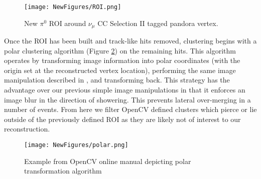 \documentclass[12pt]{article}
\begin{document}
\begin{figure}[h!]
\centering
\texttt{[image: NewFigures/ROI.png]}
\caption{New $\pi^0$ ROI around $\nu_\mu$ CC Selection II tagged pandora vertex. }
\label{fig:roi}
\end{figure}

\par Once the ROI has been built and track-like hits removed, clustering begins with a polar clustering algorithm (Figure \ref{fig:polar}) on the remaining hits. This algorithm operates by transforming image information into polar coordinates (with the origin set at the reconstructed vertex location), performing the same image manipulation described in \cite{bib:5856}, and transforming back. This strategy has the advantage over our previous simple image manipulations in that it enforces an image blur in the direction of showering. This prevents lateral over-merging in a number of events. From here we filter OpenCV defined clusters which pierce or lie outside of the previously defined ROI as they are likely not of interest to our reconstruction. 

\begin{figure}[h!]
\centering
\texttt{[image: NewFigures/polar.png]}
\caption{ Example from OpenCV online manual depicting polar transformation algorithm }
\label{fig:polar}
\end{figure}
\end{document}
